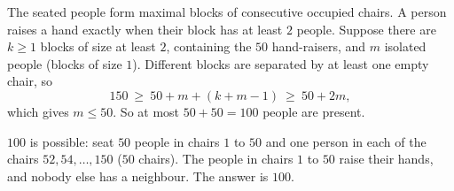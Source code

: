 The seated people form maximal blocks of consecutive occupied chairs. A person raises a hand exactly when their block has at least $2$ people. Suppose there are $k\ge1$ blocks of size at least $2$, containing the $50$ hand-raisers, and $m$ isolated people (blocks of size $1$). Different blocks are separated by at least one empty chair, so
\[
150\ \ge\ 50+m+(k+m-1)\ \ge\ 50+2m ,
\]
which gives $m\le50$. So at most $50+50=100$ people are present.

$100$ is possible: seat $50$ people in chairs $1$ to $50$ and one person in each of the chairs $52,54,\dots,150$ ($50$ chairs). The people in chairs $1$ to $50$ raise their hands, and nobody else has a neighbour. The answer is $\boxed{100}$.
